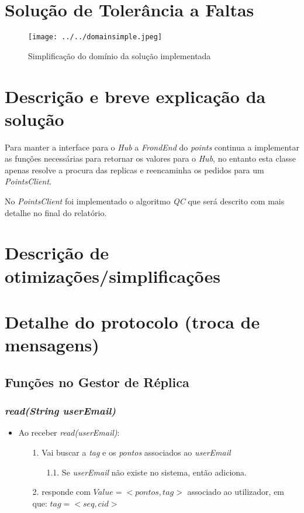 \documentclass[a4paper]{article}
\begin{document}
\section{Solução de Tolerância a Faltas}
\begin{figure}[h!]
	\texttt{[image: ../../domainsimple.jpeg]}
	\caption{Simplificação do domínio da solução implementada}
	\label{fig:domain}
\end{figure}
\section{Descrição e breve explicação da solução}

Para manter a interface para o \textit{Hub} a	\textit{FrondEnd} do \textit{points} continua a implementar as funções necessárias para retornar os valores para o \textit{Hub}, no entanto esta classe apenas resolve a procura das replicas e reencaminha os pedidos para um \textit{PointsClient}.

No \textit{PointsClient} foi implementado o algoritmo \textit{QC} que será descrito com mais detalhe no final do relatório.
\section{Descrição de otimizações/simplificações}
\section{Detalhe do protocolo (troca de mensagens)}
\subsection{Funções no Gestor de Réplica}
\subsubsection{\textit{read(String userEmail)}}
\begin{itemize}
\item Ao receber \textit{read(userEmail)}:
\begin{itemize}
\item[1.] Vai buscar a \textit{tag} e os \textit{pontos} associados ao \textit{userEmail}
\begin{itemize}
\item[1.1.] Se \textit{userEmail} não existe no sistema, então adiciona.
\end{itemize}
\item[2.] responde com \textbf{$Value=< pontos, tag >$} associado ao utilizador, em que: $tag=< seq, cid>$
\end{itemize}
\end{itemize}
\end{document}
